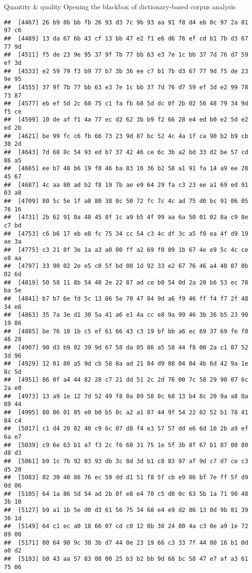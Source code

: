 \documentclass[
  ignorenonframetext,
]{beamer}
\begin{document}
\begin{frame}[fragile]{Quantity \& quality \textbar{} Opening the
blackbox of dictionary-based corpus analysis}
\begin{verbatim}
##  [4467] 26 b9 8b bb fb 26 93 d3 7c 9b 93 aa 91 f8 d4 eb 0c 97 2a 81 97 c6
##  [4489] 13 da 67 6b 43 cf 13 bb 47 e2 f1 e6 d6 76 ef cd b1 7b d3 67 77 9d
##  [4511] f5 de 23 9e 95 37 9f 7b 77 bb 63 e3 7e 1c bb 37 7d 76 d7 59 ef 3d
##  [4533] e2 59 79 f3 b9 77 b7 3b 36 ee c7 b1 7b d3 67 77 9d f5 de 23 9e 95
##  [4555] 37 9f 7b 77 bb 63 e3 7e 1c bb 37 7d 76 d7 59 ef 3d e2 99 78 73 87
##  [4577] eb ef 5d 2c 68 75 c1 fa fb 68 5d dc 0f 2b 02 56 48 79 34 9d f5 ce
##  [4599] 10 de af f1 4a 77 ec d2 62 3b b9 f2 66 28 e4 ed b0 e2 5d e2 ed 2b
##  [4621] be 99 fc c6 fb 66 73 23 9d 87 bc 52 4c 4a 1f ca 90 b2 b9 cb 30 2d
##  [4643] 7d 68 8c 54 93 ed b7 37 42 46 ce 6c 3b a2 bd 33 d2 be 57 cd 86 a5
##  [4665] ee b7 48 b6 19 f0 46 ba 83 16 36 b2 58 a1 91 fa 14 a9 ee 28 45 67
##  [4687] 4c aa 80 ad b2 f8 19 7b ae e9 64 29 fa c3 23 ee a1 69 ed 91 03 a8
##  [4709] 80 5c 5e 1f a8 80 38 0c 50 72 fc 7c 4c ad 75 d0 bc 91 06 05 76 16
##  [4731] 2b 62 91 0a 48 45 8f 1c a9 b5 4f 99 aa 6a 50 01 02 8a c9 8e c7 bd
##  [4753] c6 b6 17 eb e8 fc 75 34 cc 54 c3 4c df 3c a5 f0 ea 4f d9 19 ae 3a
##  [4775] c3 21 8f 3e 1a a3 a0 00 ff a2 69 f0 09 1b 67 4e e9 5c 4c ce e8 aa
##  [4797] 33 90 02 2e e5 c0 5f bd 00 1d 92 33 e2 67 76 46 a4 40 07 0b 02 6d
##  [4819] 50 58 11 8b 54 40 2e 22 87 ad ce b0 54 0d 2a 20 b6 53 ec 78 ba 5e
##  [4841] b7 b7 6e fd 5c 13 86 5e 70 47 84 9d a6 f9 46 ff f4 f7 2f 48 34 e6
##  [4863] 35 7a 3e d1 30 5a 41 a6 e1 4a cc e8 9a 99 46 3b 36 b5 23 90 19 86
##  [4885] be 76 18 1b c5 ef 61 66 43 c3 19 bf bb a6 ec 69 37 69 fe f0 46 28
##  [4907] 90 d3 b9 02 39 9d 67 58 da 05 86 a5 58 44 f8 00 2a c1 07 52 3d 96
##  [4929] 12 01 80 a5 9d cb 58 8a ad 21 84 d9 08 04 04 4b 6d 42 9a 1e 8c 5d
##  [4951] 86 0f a4 44 82 28 c7 21 dd 51 2c 2d 76 00 7c 58 29 90 07 6c 2a e0
##  [4973] 13 a9 1e 12 7d 52 49 f8 0a 89 58 0c 68 13 b4 8c 20 9a a8 0a 89 44
##  [4995] 80 06 01 05 e0 b0 b5 0c a2 a1 87 44 9f 54 22 02 52 b1 78 41 84 c4
##  [5017] c1 d4 20 02 40 c9 6c 07 d8 f4 e3 57 57 dd e6 6d 10 2b a9 ef 6a e7
##  [5039] c9 6e 63 b1 a7 f3 2c f6 60 31 75 1e 5f 3b 8f 67 b1 87 08 80 d8 d3
##  [5061] b9 1c 7b 92 03 93 db 3c 8d 3d b1 c8 83 97 af 9d c7 d7 ce c3 d5 20
##  [5083] 02 30 40 86 76 ec 59 dd d1 51 f8 5f cb e9 86 bf 7e ff 5f d9 0d 06
##  [5105] 64 1a 86 5d 54 ad 2b 0f e8 e4 70 c5 d8 0c 63 5b 1a 71 98 48 3b 10
##  [5127] b9 a1 1b 5e d0 d3 61 56 75 34 68 e4 e9 d2 86 13 0d 9b 81 39 36 1d
##  [5149] 64 c1 ec a0 18 66 07 cd c0 12 8b 38 24 80 4a c3 0e a9 1e 72 89 00
##  [5171] 00 64 90 9c 30 3b d7 44 0e 23 19 66 c3 33 7f 44 00 16 b1 0d a0 d2
##  [5193] b0 43 aa 57 83 08 00 25 b3 b2 bb 9d 68 bc 58 47 e7 af a3 61 75 06

\end{verbatim}
\end{frame}
\end{document}
